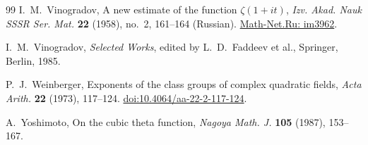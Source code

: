 \documentclass[11pt,a4paper]{article}
\numberwithin{equation}{section}
\numberwithin{figure}{section}
\theoremstyle{definition}
\theoremstyle{remark}
\begin{document}
\begin{thebibliography}{99}
I.~M.~Vinogradov,
A new estimate of the function $\zeta(1+it)$,
\emph{Izv. Akad. Nauk SSSR Ser. Mat.} \textbf{22} (1958),
no.~2, 161--164 (Russian).
\href{https://www.mathnet.ru/eng/im3962}{Math-Net.Ru: im3962}.

I.~M.~Vinogradov,
\emph{Selected Works}, edited by L.~D.~Faddeev et al.,
Springer, Berlin, 1985.

P.~J.~Weinberger,
Exponents of the class groups of complex quadratic fields,
\emph{Acta Arith.} \textbf{22} (1973), 117--124.
\href{https://doi.org/10.4064/aa-22-2-117-124}{doi:10.4064/aa-22-2-117-124}.

A.~Yoshimoto,
On the cubic theta function,
\emph{Nagoya Math. J.} \textbf{105} (1987), 153--167.

\end{thebibliography}
\end{document}
